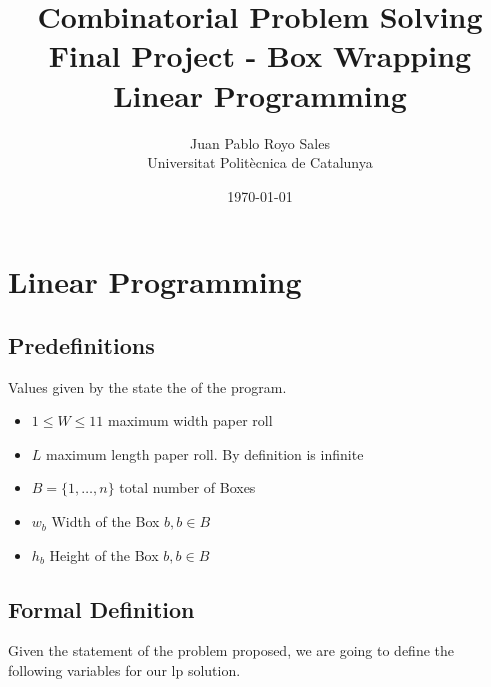 \documentclass[12pt, a4paper]{article}
\title{%
      Combinatorial Problem Solving \\
      Final Project - Box Wrapping \\
      Linear Programming
}
\author{%
  Juan Pablo Royo Sales \\
  \small{Universitat Politècnica de Catalunya}
}
\date\today
\begin{document}
\maketitle

\section{Linear Programming}

\subsection{Predefinitions}
Values given by the state the of the program.

\begin{itemize}
  \item $1 \leq W \leq 11$ maximum width paper roll
  \item $L$ maximum length paper roll. By definition is infinite
  \item $B = \{1, \dots, n\}$ total number of Boxes
  \item $w_b$ Width of the Box $b, b \in B$
  \item $h_b$ Height of the Box $b, b \in B$
\end{itemize}

\subsection{Formal Definition}
Given the statement of the problem proposed, we are going to define the following variables for our \acrfull{lp} solution.
\end{document}

